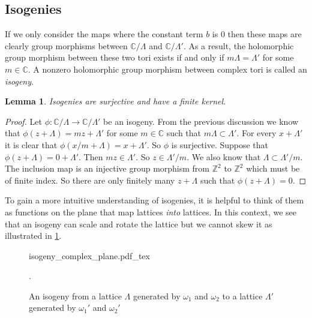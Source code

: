 \documentclass[titlepage,a4paper]{article}
\newcommand{\incfig}[1]{%
	\def\svgwidth{\columnwidth}
	{#1.pdf_tex}
}
\theoremstyle{theoremdd}
\newtheorem{lemma}[theorem]{Lemma}
\theoremstyle{definitiondd}
\theoremstyle{remarkdd}
\newcommand{\Z}{\mathbb{Z}}
\newcommand{\C}{\mathbb{C}}
\begin{document}
\subsection{Isogenies}
If we only consider the maps where the constant term $b$ is $0$ then these maps are clearly group morphisms between $\C / \Lambda$ and  $\C / \Lambda'$. 
As a result, the holomorphic group morphism between these two tori exists if and only if $m\Lambda = \Lambda'$ for some $m \in \C$. 
A nonzero holomorphic group morphism between complex tori is called an \emph{isogeny}.

\begin{lemma}
	Isogenies are surjective and have a finite kernel. 
\end{lemma}
\begin{proof}
	Let $\phi: \C / \Lambda \to \C / \Lambda'$ be an isogeny. 
	From the previous discussion we know that $\phi(z+\Lambda) = mz + \Lambda'$ for some $m \in\C$ such that $m \Lambda \subset  \Lambda'$. 
	For every  $x + \Lambda'$ it is clear that  $\phi( x / m + \Lambda) = x + \Lambda'$. 
	So  $\phi$ is surjective. 
	Suppose that $\phi(z + \Lambda) = 0 + \Lambda'$. Then  $m z \in \Lambda'$. So  $z \in  \Lambda'/m$. 
	We also know that  $\Lambda \subset \Lambda' / m$. 
	The inclusion map is an injective group morphism from $\Z^2$ to  $\Z^2$ which must be of finite index. 
	So there are only finitely many $z + \Lambda$ such that  $\phi(z + \Lambda) = 0$.
\end{proof}
To gain a more intuitive understanding of isogenies, it is helpful to think of them as functions on the plane that map lattices \emph{into} lattices.
In this context, we see that an isogeny can scale and rotate the lattice but we cannot skew it as illustrated in \cref{fig:isogeny}.
\begin{figure}[h]
	\centering
\incfig{isogeny_complex_plane}
\caption{An isogeny from a lattice $\Lambda$ generated by $\omega_1$ and $\omega_2$ to a lattice $\Lambda'$ generated by $\omega_1'$ and $\omega_2'$}.
\label{fig:isogeny}
\end{figure}
\end{document}
